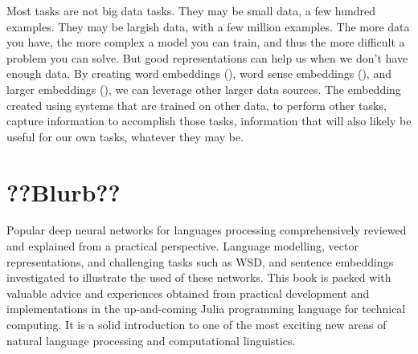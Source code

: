 \documentclass[12pt,parskip]{komatufte}
\begin{document}
Most tasks are not big data tasks.
They may be small data, a few hundred examples.
They may be largish data, with a few million examples.
The more data you have, the more complex a model you can train,
and thus the more difficult a problem you can solve.
But good representations can help us when we don't have enough data.
By creating word embeddings (),
word sense embeddings (),
and larger embeddings (),
we can leverage other larger data sources.
The embedding created using systems that are trained on other data, to perform other tasks,
capture information to accomplish those tasks,
information that will also likely be useful for our own tasks, whatever they may be.




\section{??Blurb??}

Popular deep neural networks for languages processing comprehensively reviewed and explained from a practical perspective.
Language modelling, vector representations, and challenging tasks such as WSD, and sentence embeddings investigated to illustrate the used of these networks.
This book is packed with valuable advice and experiences
obtained from practical development and implementations 
in the up-and-coming Julia programming language for technical computing.
It is a solid introduction to one of the most exciting new areas of natural language processing and computational linguistics.
\end{document}
